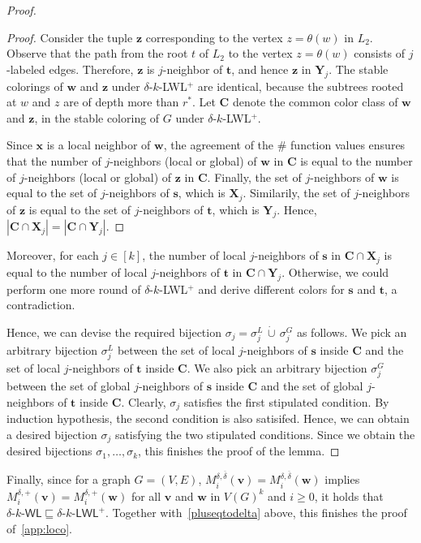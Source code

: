\documentclass{article}
\theoremstyle{definition}
\newcommand{\ndelta}{\ensuremath{\overline{\delta}}}
\renewcommand{\vec}[1]{\mathbf{#1}}
\newcommand{\deltakwlm}{\delta\textrm{-}k\textrm{-}\textsf{WL}\xspace}
\newcommand{\pluskwl}{$\delta$-$k$-\textsf{LWL}$^+$\xspace}
\newcommand{\pluskwlm}{\delta\textrm{-}k\textrm{-}\textsf{LWL}^+\xspace}
\begin{document}
\begin{proof}
\begin{proof}
		Consider the tuple $\vec{z}$ corresponding to the vertex $z = \theta(w)$ in $L_2$. Observe that the path from the root $t$ of $L_2$ to the vertex $z =\theta(w)$ consists of $j$-labeled edges. Therefore, $\vec{z}$ is $j$-neighbor of $\vec{t}$, and hence $\vec{z}$ in $\vec{Y}_j$. The stable colorings of $\vec{w}$ and $\vec{z}$ under \pluskwl are identical, because the subtrees rooted at $w$ and $z$ are of depth more than $r^*$. Let $\vec{C}$ denote the common color class of $\vec{w}$ and $\vec{z}$, in the stable coloring of $G$ under \pluskwl.
		
		Since $\vec{x}$ is a local neighbor of $\vec{w}$, the agreement of the $\#$ function values ensures that the number of $j$-neighbors (local or global) of $\vec{w}$ in $\vec{C}$ is equal to the number of $j$-neighbors (local or global) of $\vec{z}$ in $\vec{C}$. Finally, the set of $j$-neighbors of $\vec{w}$ is equal to the set of $j$-neighbors of $\vec{s}$, which is $\vec{X}_j$. Similarily, the set of $j$-neighbors of $\vec{z}$ is equal to the set of $j$-neighbors of $\vec{t}$, which is $\vec{Y}_j$. 
		Hence, $|\vec{C} \cap \vec{X}_j| = |\vec{C} \cap \vec{Y}_j|$. 
	\end{proof} 
	
	Moreover, for each $j \in [k]$, the number of local $j$-neighbors of $\vec{s}$ in $\vec{C} \cap \vec{X}_j$ is equal to the number of local $j$-neighbors of $\vec{t}$ in $\vec{C} \cap \vec{Y}_j$. Otherwise, we could perform one more round of \pluskwl and derive different colors for $\vec{s}$ and $\vec{t}$, a contradiction. 
	
	Hence, we can devise the required bijection $\sigma_j = \sigma_j^L \,\dot\cup\, \sigma_j^G$ as follows. We pick an arbitrary bijection $\sigma_j^L$ between the set of local $j$-neighbors of $\vec{s}$ inside $\vec{C}$ and the set of local $j$-neighbors of $\vec{t}$ inside $\vec{C}$. We also pick an arbitrary bijection $\sigma_j^G$ between the set of global $j$-neighbors of $\vec{s}$ inside $\vec{C}$ and the set of global $j$-neighbors of $\vec{t}$ inside $\vec{C}$. Clearly, $\sigma_j$ satisfies the first stipulated condition. By induction hypothesis, the second condition is also satisifed. Hence, we can obtain a desired bijection $\sigma_j$ satisfying the two stipulated conditions. Since we obtain the desired bijections $\sigma_1,\dots,\sigma_k$, this finishes the proof of the lemma. 
\end{proof}

Finally, since for a graph $G=(V,E)$,  $M^{\delta,\ndelta}_i(\vec{v}) = M^{\delta,\ndelta}_i(\vec{w})$ implies $M^{\delta,+}_i(\vec{v}) = M^{\delta,+}_i(\vec{w})$  for all $\vec{v}$ and $\vec{w}$ in $V(G)^k$ and $i\geq 0$, it holds that $\deltakwlm \sqsubseteq \pluskwlm$. Together with~\cref{pluseqtodelta} above, this finishes the proof of~\cref{app:loco}.
\end{document}
